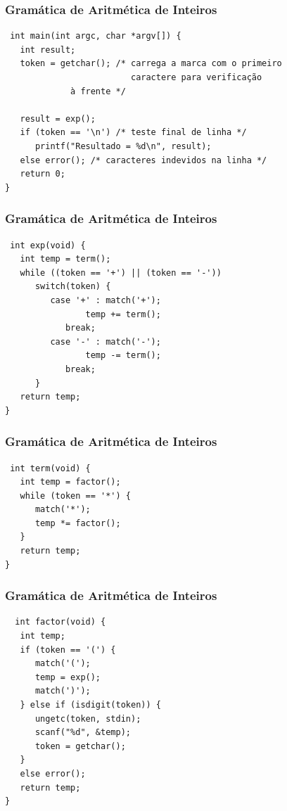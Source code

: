 \documentclass[table]{beamer}
\begin{document}
\begin{frame}[fragile]
   \frametitle{Gramática de Aritmética de Inteiros}
   \begin{verbatim}
 int main(int argc, char *argv[]) {
   int result;
   token = getchar(); /* carrega a marca com o primeiro 
                         caractere para verificação 
			 à frente */

   result = exp();
   if (token == '\n') /* teste final de linha */
      printf("Resultado = %d\n", result);
   else error(); /* caracteres indevidos na linha */
   return 0;
}
   \end{verbatim}
\end{frame}

\begin{frame}[fragile]
   \frametitle{Gramática de Aritmética de Inteiros}
   \begin{verbatim}
 int exp(void) {
   int temp = term();
   while ((token == '+') || (token == '-'))
      switch(token) {
         case '+' : match('+');
	            temp += term();
		    break;
         case '-' : match('-');
	            temp -= term();
		    break;
      }
   return temp;
}
   \end{verbatim}
\end{frame}

\begin{frame}[fragile]
   \frametitle{Gramática de Aritmética de Inteiros}
   \begin{verbatim}
 int term(void) {
   int temp = factor();
   while (token == '*') {
      match('*');
      temp *= factor();
   }
   return temp;
}
   \end{verbatim}
\end{frame}

\begin{frame}[fragile]
   \frametitle{Gramática de Aritmética de Inteiros}
   \begin{verbatim}
  int factor(void) {
   int temp;
   if (token == '(') {
      match('(');
      temp = exp();
      match(')');
   } else if (isdigit(token)) {
      ungetc(token, stdin);
      scanf("%d", &temp);
      token = getchar();
   }
   else error();
   return temp;
} 
   \end{verbatim}
\end{frame}
\end{document}
